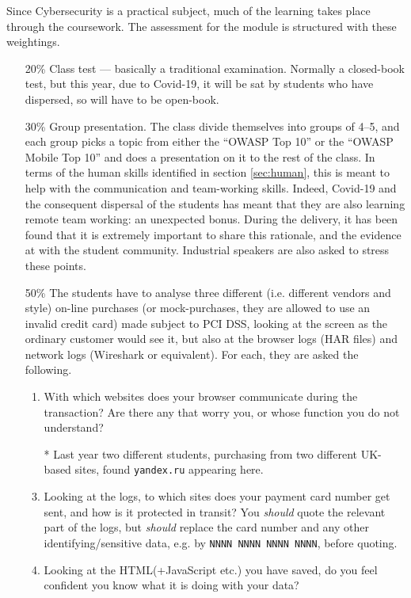 \documentclass[conference]{IEEEtran}
\begin{document}
Since Cybersecurity is a practical subject, much of the learning takes place through the coursework. The assessment for the module is structured with these weightings.
\begin{itemize}
\item[20\%]Class test --- basically a traditional examination. Normally a closed-book test, but this year, due to Covid-19, it will be sat by students who have dispersed, so will have to be open-book.
\item[30\%]Group presentation. The class divide themselves into groups of 4--5, and each group picks a topic from either the ``OWASP Top 10'' \cite{OWASP2017a} or the ``OWASP Mobile Top  10'' \cite{OWASP2016a} and does a presentation on it to the rest of the class.  In terms of the human skills identified in section \ref{sec:human}, this is meant to help with the communication and team-working skills. Indeed, Covid-19 and the consequent dispersal of the students has meant that they are also learning remote team working: an unexpected bonus.  During the delivery, it has been found that it is extremely important to share this rationale, and the evidence at \cite{WallStreetJournal2018c,InfoSec2019a,Beaver2019c} with the student community.  Industrial speakers are also asked to stress these points.
\item[50\%]The students have to analyse three different (i.e. different vendors and style) on-line purchases (or mock-purchases, they are allowed to use an invalid  credit card) made subject to PCI DSS, looking at the screen as the ordinary customer would see it, but also at the browser logs (HAR files) and network logs (Wireshark or equivalent). For each, they are asked the following.
\begin{enumerate}
\item With which websites does your browser communicate during the transaction? Are there any that worry you, or whose function you do not understand?
\item[*]Last year two different students, purchasing from two different UK-based sites, found \verb+yandex.ru+ appearing here.
\item Looking at the logs, to which sites does your payment card number get sent, and how is it protected in transit? You \emph{should} quote the relevant part of the logs, but \emph{should} replace the card number and any other identifying/sensitive data, e.g. by \verb+NNNN NNNN NNNN NNNN+, before quoting.
\item Looking at the HTML(+JavaScript etc.) you have saved, do you feel confident you know what it is doing with your data?

\end{enumerate}
\end{itemize}
\end{document}
